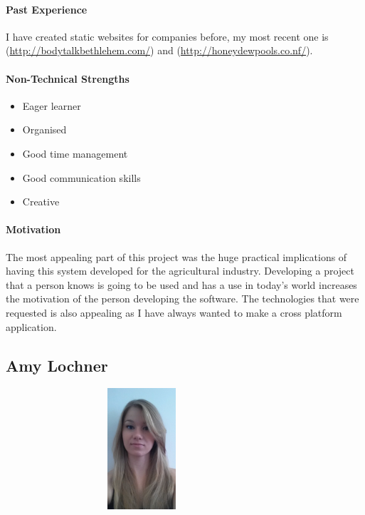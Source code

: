 \documentclass[english]{article}
\begin{document}
		\paragraph{Past Experience}
		I have created static websites for companies before, my most recent one is (\href{http://bodytalkbethlehem.com/}{http://bodytalkbethlehem.com/}) and (\href{http://honeydewpools.co.nf/}{http://honeydewpools.co.nf/}).
		
		\paragraph{Non-Technical Strengths}
		\begin{itemize}
			\setlength\itemsep{0.2em}
			\item Eager learner
			\item Organised 
			\item Good time management
			\item Good communication skills
			\item Creative
		\end{itemize}
		
		\paragraph{Motivation}
		The most appealing part of this project was the huge practical implications of having this system developed for the agricultural industry. Developing a project that a person knows is going to be used and has a use in today's world increases the motivation of the person developing the software. The technologies that were requested is also appealing as I have always wanted to make a cross platform application.
		
		\newpage
		\subsection{Amy Lochner}
		\begin{figure}
			\begin{center}
				\includegraphics[width=8cm, height=4.5cm, angle=90]{amy.jpg}
			\end{center}
		\end{figure}
\end{document}
